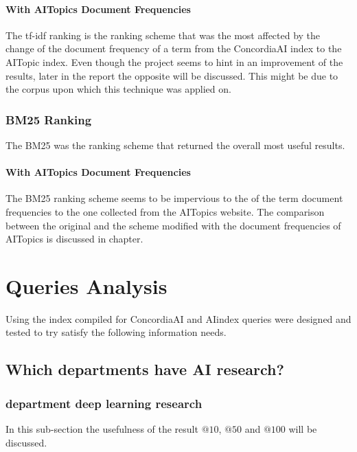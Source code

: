\subsubsection{With AITopics Document Frequencies}

The tf-idf ranking is the ranking scheme that was the most affected by the change of the document frequency of a term from the ConcordiaAI index to the AITopic index. Even though the project seems to hint in an improvement of the results, later in the report the opposite will be discussed. This might be due to the corpus upon which this technique was applied on.

\subsection{BM25 Ranking} \label{BM25}

\par The BM25 was the ranking scheme that returned the overall most useful results. 

\subsubsection{With AITopics Document Frequencies}

\par The BM25 ranking scheme seems to be impervious to the of the term document frequencies to the one collected from the AITopics website. The comparison between the original and the scheme modified with the document frequencies of AITopics is discussed in chapter.

\chapter{Queries Analysis}

\par Using the index compiled for ConcordiaAI and AIindex queries were designed and tested to try satisfy the following information needs.

\section{Which departments have AI research?}
\subsection{department deep learning research}\label{query-1}

\par In this sub-section the usefulness of the result $@10$, $@50$ and $@100$ will be discussed.
